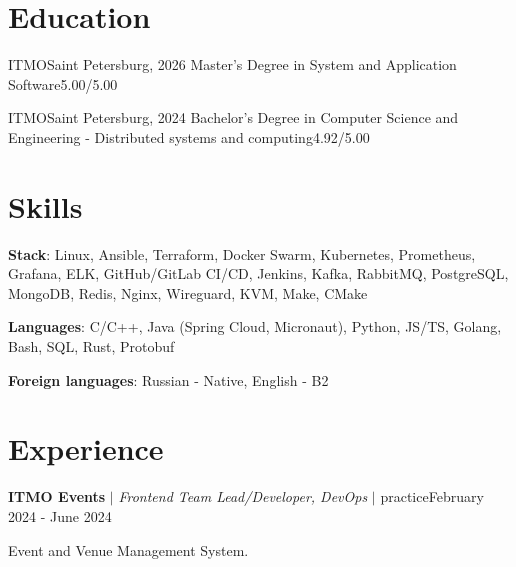 \documentclass[letterpaper,11pt]{article}
\begin{document}
\section{Education}
\resumeSubHeadingListStart
  \resumeSubheading
    {ITMO}{Saint Petersburg, 2026}
    {Master’s Degree in System and Application Software}{5.00/5.00}

  \resumeSubheading
    {ITMO}{Saint Petersburg, 2024}
    {Bachelor’s Degree in Computer Science and Engineering - Distributed systems and computing}{4.92/5.00}
\resumeSubHeadingListEnd

\section{Skills}
\resumeSubHeadingListStart
  \small{\item{
    \textbf{Stack}{: Linux, Ansible, Terraform, Docker Swarm, Kubernetes, Prometheus, Grafana, ELK, GitHub/GitLab CI/CD, Jenkins, Kafka, RabbitMQ, PostgreSQL, MongoDB, Redis, Nginx, Wireguard, KVM, Make, CMake }

   \textbf{Languages}{: C/C++, Java (Spring Cloud, Micronaut), Python, JS/TS, Golang, Bash, SQL, Rust, Protobuf }

   \textbf{Foreign languages}{: Russian - Native, English - B2}%
  }}
\resumeSubHeadingListEnd

\section{Experience}
\resumeSubHeadingListStart
  \resumeExperienceHeading
    {\textbf{ITMO Events} $|$ \footnotesize\emph{Frontend Team Lead/Developer, DevOps} $|$ practice}{February 2024 - June 2024}

    {\vspace{-10pt}\small Event and Venue Management System.\vspace{-7pt}}

  \resumeItemListStart
  \resumeItemListEnd
\end{document}
